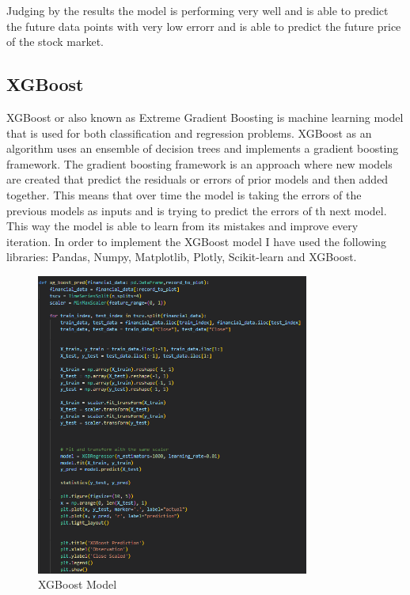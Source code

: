 \documentclass{imc-inf}
\begin{document}
			Judging by the results the model is performing very well and is able to predict the future data points with very low errorr and is able to predict the future price of the stock market.
			
	
		
		\subsection{XGBoost}
			XGBoost or also known as Extreme Gradient Boosting is machine learning model that is used for both classification and regression problems. XGBoost as an algorithm uses an ensemble of decision trees
			and implements a gradient boosting framework. The gradient boosting framework is an approach where new models are created that predict the residuals or errors of prior models and then added together.
			This means that over time the model is taking the errors of the previous models as inputs and is trying to predict the errors of th next model. This way the model is able to learn from its mistakes and improve every
			iteration. In order to implement the XGBoost model \cite{xgboost_implement} I have used the following libraries: Pandas, Numpy, Matplotlib, Plotly, Scikit-learn and XGBoost. 
			\begin{figure}[h]
				\centering
				\includegraphics[width=0.8\textwidth]{xgboost_code.png}
				\caption{XGBoost Model}
				\label{fig:xgboost_model}
			\end{figure}
\end{document}

